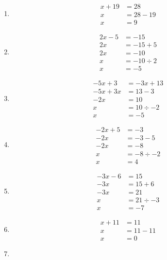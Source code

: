 \documentclass[11pt]{article}
\begin{document}
\begin{multicols}{3}

\begin{enumerate}
    \item
    \begin{align*}
        x + 19 &= 28 \\
        x &= 28 - 19 \\
        x &= 9
    \end{align*}
    \item
    \begin{align*}
        2x - 5 &= - 15 \\
        2x &= -15 + 5 \\
        2x &= -10\\
        x &= -10 \div 2 \\
        x &= -5 
    \end{align*}
    \item
    \begin{align*}
        -5x + 3 &= -3x + 13 \\
        -5x +3x &= 13 - 3 \\
        -2x &= 10 \\
        x &= 10 \div -2 \\
        x &= -5 
    \end{align*}
    \item
    \begin{align*}
       -2x + 5 &= -3 \\
       -2x  &= -3 - 5 \\
       -2x &= -8 \\
        x &= -8 \div -2 \\
        x &= 4 
    \end{align*}
    \item
    \begin{align*}
        -3x - 6 &= 15 \\
        -3x &= 15 + 6 \\
        -3x &= 21 \\
        x &= 21 \div -3 \\
        x &= -7 
    \end{align*}
    \item
    \begin{align*}
       x +11 &= 11 \\
       x &= 11 - 11 \\
       x &= 0 
    \end{align*}
    \item
    \begin{align*}

\end{align*}
\end{enumerate}
\end{multicols}
\end{document}
